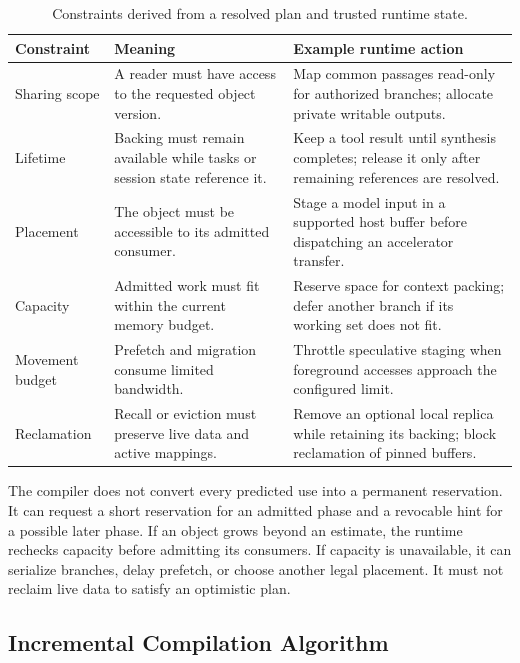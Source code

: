 \documentclass[letterpaper,twocolumn,10pt]{article}
\begin{document}
\begin{table}[t]
\centering
\caption{Constraints derived from a resolved plan and trusted runtime state.}
\label{tab:constraints}
\begin{tabular}{>{\raggedright\arraybackslash}p{}>{\raggedright\arraybackslash}p{}>{\raggedright\arraybackslash}p{}}
\toprule
Constraint & Meaning & Example runtime action \\
\midrule
Sharing scope & A reader must have access to the requested object version. & Map common passages read-only for authorized branches; allocate private writable outputs. \\
Lifetime & Backing must remain available while tasks or session state reference it. & Keep a tool result until synthesis completes; release it only after remaining references are resolved. \\
Placement & The object must be accessible to its admitted consumer. & Stage a model input in a supported host buffer before dispatching an accelerator transfer. \\
Capacity & Admitted work must fit within the current memory budget. & Reserve space for context packing; defer another branch if its working set does not fit. \\
Movement budget & Prefetch and migration consume limited bandwidth. & Throttle speculative staging when foreground accesses approach the configured limit. \\
Reclamation & Recall or eviction must preserve live data and active mappings. & Remove an optional local replica while retaining its backing; block reclamation of pinned buffers. \\
\bottomrule
\end{tabular}
\end{table}

The compiler does not convert every predicted use into a permanent reservation.
It can request a short reservation for an admitted phase and a revocable hint
for a possible later phase. If an object grows beyond an estimate, the runtime
rechecks capacity before admitting its consumers. If capacity is unavailable,
it can serialize branches, delay prefetch, or choose another legal placement.
It must not reclaim live data to satisfy an optimistic plan.

\subsection{Incremental Compilation Algorithm}
\label{sec:algorithm}
\end{document}
